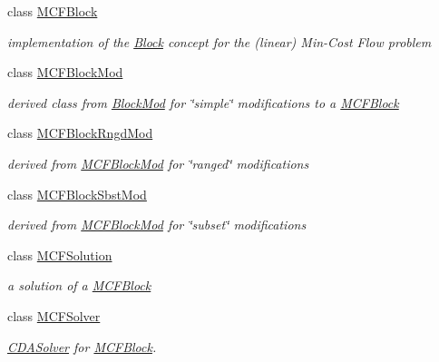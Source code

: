 \begin{DoxyCompactItemize}
class \mbox{\hyperlink{class_s_m_spp__di__unipi__it_1_1_m_c_f_block}{M\+C\+F\+Block}}
\begin{DoxyCompactList}\small\item\em implementation of the \mbox{\hyperlink{class_s_m_spp__di__unipi__it_1_1_block}{Block}} concept for the (linear) Min-\/\+Cost Flow problem \end{DoxyCompactList}\item 
class \mbox{\hyperlink{class_s_m_spp__di__unipi__it_1_1_m_c_f_block_mod}{M\+C\+F\+Block\+Mod}}
\begin{DoxyCompactList}\small\item\em derived class from \mbox{\hyperlink{class_s_m_spp__di__unipi__it_1_1_block_mod}{Block\+Mod}} for \char`\"{}simple\char`\"{} modifications to a \mbox{\hyperlink{class_s_m_spp__di__unipi__it_1_1_m_c_f_block}{M\+C\+F\+Block}} \end{DoxyCompactList}\item 
class \mbox{\hyperlink{class_s_m_spp__di__unipi__it_1_1_m_c_f_block_rngd_mod}{M\+C\+F\+Block\+Rngd\+Mod}}
\begin{DoxyCompactList}\small\item\em derived from \mbox{\hyperlink{class_s_m_spp__di__unipi__it_1_1_m_c_f_block_mod}{M\+C\+F\+Block\+Mod}} for \char`\"{}ranged\char`\"{} modifications \end{DoxyCompactList}\item 
class \mbox{\hyperlink{class_s_m_spp__di__unipi__it_1_1_m_c_f_block_sbst_mod}{M\+C\+F\+Block\+Sbst\+Mod}}
\begin{DoxyCompactList}\small\item\em derived from \mbox{\hyperlink{class_s_m_spp__di__unipi__it_1_1_m_c_f_block_mod}{M\+C\+F\+Block\+Mod}} for \char`\"{}subset\char`\"{} modifications \end{DoxyCompactList}\item 
class \mbox{\hyperlink{class_s_m_spp__di__unipi__it_1_1_m_c_f_solution}{M\+C\+F\+Solution}}
\begin{DoxyCompactList}\small\item\em a solution of a \mbox{\hyperlink{class_s_m_spp__di__unipi__it_1_1_m_c_f_block}{M\+C\+F\+Block}} \end{DoxyCompactList}\item 
class \mbox{\hyperlink{class_s_m_spp__di__unipi__it_1_1_m_c_f_solver}{M\+C\+F\+Solver}}
\begin{DoxyCompactList}\small\item\em \mbox{\hyperlink{class_s_m_spp__di__unipi__it_1_1_c_d_a_solver}{C\+D\+A\+Solver}} for \mbox{\hyperlink{class_s_m_spp__di__unipi__it_1_1_m_c_f_block}{M\+C\+F\+Block}}. \end{DoxyCompactList}\item 

\end{DoxyCompactItemize}
